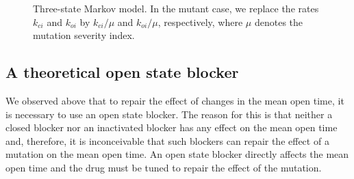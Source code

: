 \begin{figure}[ptb]
\begin{center}
\end{center}
\caption{Three-state Markov model. In the mutant case, we
replace the rates $k_{ci}$ and $k_{oi}$ by  $k_{ci}/\mu$ and $k_{oi}/\mu$, 
respectively, where $\mu$ denotes the mutation severity index.}
\label{MOT_mut_L/ICO.pdf}%
\end{figure}





\subsection{A theoretical open state blocker}



We observed above that to repair the effect of changes in the mean
open time, it is necessary to use an open state blocker. The reason for this is 
that neither a closed blocker nor an inactivated blocker has any effect on the 
mean open time and, therefore, it is inconceivable that such blockers 
can repair the effect of a mutation on the mean open time. An open state blocker 
directly affects the mean open time and the drug must be tuned to repair the 
effect of the mutation.

